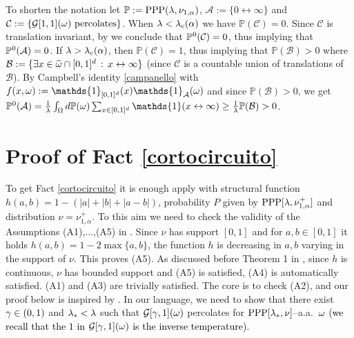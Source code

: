 \documentclass[12pt,a4paper,reqno]{amsart}
\newcommand{\cA}{\ensuremath{\mathcal A}}
\newcommand{\cB}{\ensuremath{\mathcal B}}
\newcommand{\cC}{\ensuremath{\mathcal C}}
\newcommand{\cG}{\ensuremath{\mathcal G}}
\newcommand{\bbP}{{\ensuremath{\mathbb P}} }
\let\a=\alpha \let\b=\beta   \let\d=\delta  \let\e=\varepsilon
\let\O=\Omega \let\P=\Pi   \let\Ps=\Psi \let\Si=\Sigma \let\X=\Xi
\newcommand{\vvv}{\textcolor{black}} %
\newcommand{\orc}{\textcolor{black}} %
\newcommand{\vpz}{\vvv{\bbP^{\hspace{0.013cm}0} }}
\begin{document}
To shorten the notation let $\bbP:=  {\rm PPP}(\l, \nu_{1,\a})$, $\cA:=\{0 \leftrightarrow \infty\}$  and  $\cC:=\{ \cG[1,1](\o)\text{ percolates}\}$.  When 
$\l < \l_c(\a)$ we have  $\bbP(\cC)=0$. Since $\cC$ is translation invariant, by \cite[Lemma~7.1]{Fhom1}  we conclude that $\vpz(\cC)=0$, thus implying that $\vpz(\cA)=0$. If $\l > \l_c(\a)$, then $\bbP(\cC)=1$, thus implying that $\bbP(\cB)>0$ where $\cB:=\{\exists x\in \widehat{\o}\cap[0,1]^d\,:\, x\leftrightarrow \infty\}$ (since $\cC$ is a countable union of translations of $\cB$).
By Campbell's identity \eqref{campanello} with $f(x,\o):=\orc{\mathds{1}_{[0,1]^d}(x) \mathds{1}_\cA (\o )}$ and since $\bbP(\cB)>0$, we get
$
\vpz(\cA)=\frac{1}{\l} \int _\O d\bbP(\o) \sum_{x\in [0,1]^d} \mathds{1}(x \leftrightarrow \infty)\geq \frac{1}{\l}\bbP(\cB)>0$.




\section{Proof of Fact \ref{cortocircuito}}\label{pinco}
To get Fact \ref{cortocircuito}
it is enough apply  \cite[Thm.~1]{FagMim2} with structural function $h(a,b)=1-(|a|+|b|+|a-b|)$, probability  $P$ given by ${\rm PPP}[\l,\nu^+_{1,\a}]$ and distribution $\nu =\nu^+_{1,\a}$. To this aim we need to   check the  validity of the Assumptions (A1),...,(A5) in \cite[Section~2]{FagMim2}.  Since $\nu$ has support $[0,1]$ and for $a,b\in [0,1]$ it holds $h(a,b)=1-2 \max\{a,b\}$, the function $h$ is decreasing in $a,b$ varying in the support of $\nu$. This proves (A5). As discussed before Theorem 1 in \cite{FagMim2}, since $h$ is continuous, $\nu$ has bounded support and (A5)  is satisfied, (A4) is automatically satisfied.
(A1) and (A3) are trivially satisfied. The core is to check (A2), and our proof below is inspired by \cite[Section~8]{FagMim2}.  In our language, we need to show that there exist $\gamma\in (0,1)$ and \orc{$\lambda_*<\lambda $} such that $\cG[\g,1](\o)$ percolates for ${\rm PPP}[\lambda_*, \nu]$--a.a.~$\omega$ \orc{(we recall that the $1$ in $\cG[\g,1](\o)$ is the inverse temperature)}.
\end{document}

